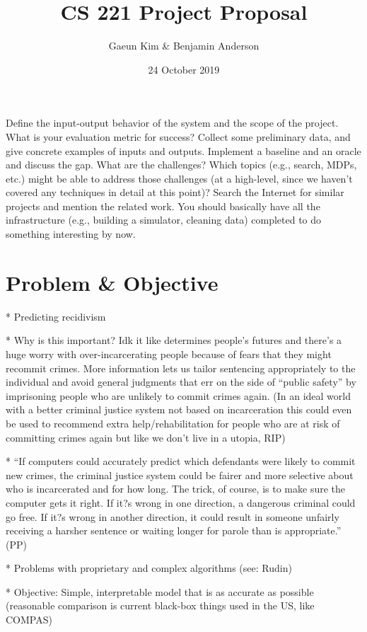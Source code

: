 \documentclass[10pt]{article}
\title{CS 221 Project Proposal}
\author{Gaeun Kim \& Benjamin Anderson}
\date{24 October 2019}
\begin{document}
\maketitle

Define the input-output behavior of the system and the scope of the project. What is your evaluation metric for success? Collect some preliminary data, and give concrete examples of inputs and outputs. Implement a baseline and an oracle and discuss the gap. What are the challenges? Which topics (e.g., search, MDPs, etc.) might be able to address those challenges (at a high-level, since we haven't covered any techniques in detail at this point)? Search the Internet for similar projects and mention the related work. You should basically have all the infrastructure (e.g., building a simulator, cleaning data) completed to do something interesting by now.

\section{Problem \& Objective}
* Predicting recidivism

* Why is this important? Idk it like determines people's futures and there's a huge worry with over-incarcerating people because of fears that they might recommit crimes. More information lets us tailor sentencing appropriately to the individual and avoid general judgments that err on the side of ``public safety'' by imprisoning people who are unlikely to commit crimes again. (In an ideal world with a better criminal justice system not based on incarceration this could even be used to recommend extra help/rehabilitation for people who are at risk of committing crimes again but like we don't live in a utopia, RIP)

* ``If computers could accurately predict which defendants were likely to commit new crimes, the criminal justice system could be fairer and more selective about who is incarcerated and for how long. The trick, of course, is to make sure the computer gets it right. If it?s wrong in one direction, a dangerous criminal could go free. If it?s wrong in another direction, it could result in someone unfairly receiving a harsher sentence or waiting longer for parole than is appropriate.'' (PP)

* Problems with proprietary and complex algorithms (see: Rudin)

* Objective: Simple, interpretable model that is as accurate as possible (reasonable comparison is current black-box things used in the US, like COMPAS)
\end{document}
